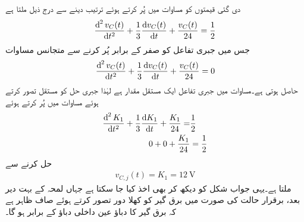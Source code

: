 دی گئی قیمتوں کو مساوات  میں  پُر کرتے ہوئے ترتیب دینے سے درج ذیل ملتا ہے
\begin{align}\label{مساوات_عارضی_مثال_سلسلہ_وار_پ}
\frac{\dif^{\,2} v_C(t)}{\dif t^2}+\frac{1}{3}\frac{\dif v_C(t)}{\dif t}+\frac{v_C(t)}{24}=\frac{1}{2}
\end{align}
جس میں جبری تفاعل کو صفر کے برابر پُر کرنے سے متجانس مساوات
\begin{align}\label{مساوات_مثال_ہم_جنسی_دو_درجی}
\frac{\dif^{\,2} v_C(t)}{\dif t^2}+\frac{1}{3}\frac{\dif v_C(t)}{\dif t}+\frac{v_C(t)}{24}=0
\end{align}
حاصل ہوتی ہے۔مساوات  میں جبری تفاعل ایک مستقل مقدار ہے لہٰذا جبری حل کو مستقل  تصور کرتے ہوئے مساوات  میں پُر کرتے ہوئے
\begin{align*}
\frac{\dif^{\,2} K_1}{\dif t^2}+\frac{1}{3}\frac{\dif K_1}{\dif t}+\frac{K_1}{24}=&\frac{1}{2}\\
0+0+\frac{K_1}{24}&=\frac{1}{2}
\end{align*}
حل کرنے سے
\begin{align*}
v_{C,j}(t)=K_1=\SI{12}{\volt}
\end{align*}
ملتا ہے۔یہی جواب شکل  کو دیکھ کر بھی اخذ کیا جا سکتا ہے جہاں لمحہ  کے بہت دیر بعد، برقرار  حالت کی صورت میں برق گیر کو کھلا دور تصور کرتے ہوئے صاف ظاہر ہے کہ برق گیر کا دباؤ عین داخلی دباؤ کے برابر ہو گا۔

